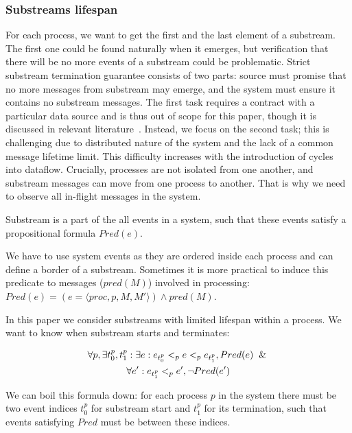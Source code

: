 \subsubsection{Substreams lifespan}

For each process, we want to get the first and the last element of a substream. The first one could be found naturally when it emerges, but verification that there will be no more events of a substream could be problematic. Strict substream termination guarantee consists of two parts: source must promise that no more messages from substream may emerge, and the system must ensure it contains no substream messages. The first task requires a contract with a particular data source and is thus out of scope for this paper, though it is discussed in relevant literature~\cite{awad2019adaptive}. Instead, we focus on the second task; this is challenging due to distributed nature of the system and the lack of a common message lifetime limit. This difficulty increases with the introduction of cycles into dataflow. Crucially, processes are not isolated from one another, and substream messages can move from one process to another. That is why we need to observe all in-flight messages in the system.

\begin{definition}[Substream]
Substream is a part of the all events in a system, such that these events satisfy a propositional formula $Pred(e)$.
\end{definition}

We have to use system events as they are ordered inside each process and can define a border of a substream. Sometimes it is more practical to induce this predicate to messages ($pred(M)$) involved in processing: $Pred(e) = (e = \langle proc, p, M, M'\rangle) \wedge pred(M)$.

In this paper we consider substreams with limited lifespan within a process. We want to know when substream starts and terminates: 

\begin{multline}
\forall p, \exists t_0^p, t_1^p: \exists e: e_{t_0^p} <_p e <_p e_{t_1^p}, Pred(e) \And \\ \forall e': e_{t_1^p} <_p e', \neg Pred(e') 
\end{multline}

We can boil this formula down: for each process $p$ in the system there must be two event indices $t_0^p$ for substream start and $t_1^p$ for its termination, such that events satisfying $Pred$ must be between these indices. 

